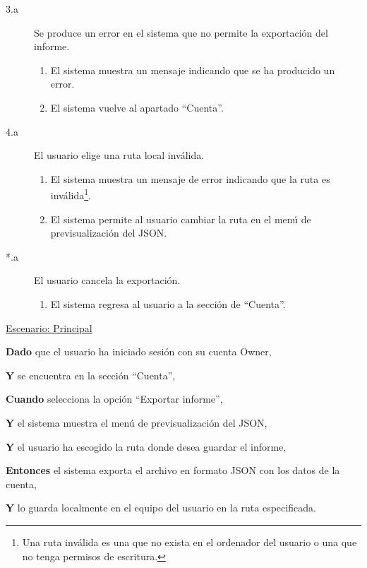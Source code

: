 \begin{description}
    \item[3.a] Se produce un error en el sistema que no permite la exportación del informe.
    \begin{enumerate}
        \item[3.a.1] El sistema muestra un mensaje indicando que se ha producido un error.
        \item[3.a.2] El sistema vuelve al apartado \enquote{Cuenta}.
    \end{enumerate}

    \newpage %

    \item[4.a] El usuario elige una ruta local inválida.
    \begin{enumerate}
        \item[4.a.1] El sistema muestra un mensaje de error indicando que la ruta es inválida\footnote{Una ruta inválida es una que no exista en el ordenador del usuario o una que no tenga permisos de escritura.}.
        \item[4.a.2] El sistema permite al usuario cambiar la ruta en el menú de previsualización del JSON.
    \end{enumerate}
    \item[*.a] El usuario cancela la exportación.
    \begin{enumerate}
        \item[*.a.1] El sistema regresa al usuario a la sección de \enquote{Cuenta}.
    \end{enumerate}
\end{description}

\underline{Escenario: Principal}\par
\vspace{0.15cm}
\textbf{Dado} que el usuario ha iniciado sesión con su cuenta Owner,\par
\textbf{Y} se encuentra en la sección \enquote{Cuenta},\par
\textbf{Cuando} selecciona la opción \enquote{Exportar informe},\par
\textbf{Y} el sistema muestra el menú de previsualización del JSON,\par
\textbf{Y} el usuario ha escogido la ruta donde desea guardar el informe,\par
\textbf{Entonces} el sistema exporta el archivo en formato JSON con los datos de la cuenta,\par
\textbf{Y} lo guarda localmente en el equipo del usuario en la ruta especificada.\par
\vspace{0.20cm}

